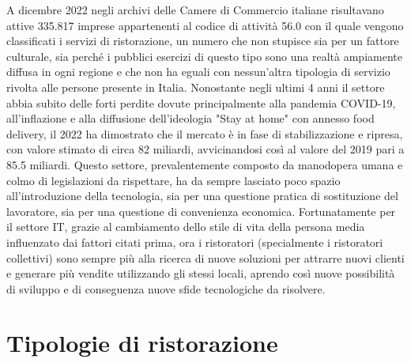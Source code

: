 \documentclass[a4paper, titlepage, 12pt, openright, twoside]{book}
\begin{document}
A dicembre 2022 negli archivi delle Camere di Commercio italiane risultavano attive 335.817 
imprese appartenenti al codice di attività 56.0 con il quale vengono classificati i servizi di ristorazione,
un numero che non stupisce sia per un fattore culturale, sia perché i pubblici esercizi di questo tipo sono
una realtà ampiamente diffusa in ogni regione e che non ha eguali con nessun'altra tipologia di servizio rivolta alle persone presente in Italia.
\newline
Nonostante negli ultimi 4 anni il settore abbia subito delle forti perdite dovute principalmente alla pandemia COVID-19,
all'inflazione e alla diffusione dell'ideologia "Stay at home" con annesso food delivery, 
il 2022 ha dimostrato che il mercato è in fase di stabilizzazione e ripresa, con valore stimato di circa 82 miliardi,
avvicinandosi così al valore del 2019 pari a 85.5 miliardi. \cite{rristorazione}
\newline
Questo settore, prevalentemente composto da manodopera umana e colmo di legislazioni da rispettare,
ha da sempre lasciato poco spazio all'introduzione della tecnologia, sia per una questione pratica di sostituzione del lavoratore,
sia per una questione di convenienza economica.
\newline
Fortunatamente per il settore IT, grazie al cambiamento dello stile di vita della persona media influenzato dai fattori citati prima,
ora i ristoratori (specialmente i ristoratori collettivi) sono sempre più alla ricerca di nuove soluzioni per attrarre nuovi clienti
e generare più vendite utilizzando gli stessi locali, aprendo così nuove possibilità di sviluppo e di conseguenza nuove sfide tecnologiche da risolvere.

\section{Tipologie di ristorazione}
\end{document}
